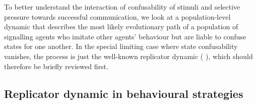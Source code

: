 \documentclass[11pt,english]{article}
\numberwithin{equation}{section}
\newcommand{\citepbjps}[1]{(\citeauthor{#1} \citeyear{#1})}
\begin{document}
To better understand the interaction of confusability of stimuli and selective pressure towards
successful communication, we look at a population-level dynamic that describes the most likely
evolutionary path of a population of signalling agents who imitate other agents' behaviour but
are liable to confuse states for one another. In the special limiting case where state
confusability vanishes, the process is just the well-known replicator dynamic
\citepbjps{TaylorJonker1978:Evolutionary-St}, which should therefore be briefly reviewed first.


\subsection{Replicator dynamic in behavioural strategies}
\label{sec:repl-dynam-behav}
\end{document}
